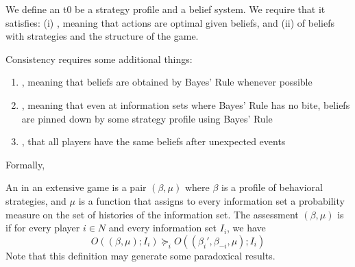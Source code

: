 \documentclass[10pt]{article}
\begin{document}
\begin{definition}
	We define an  t0 be a strategy profile and a belief system. We require that it satisfies: (i) , meaning that actions are optimal given beliefs, and (ii)  of beliefs with strategies and the structure of the game.
	
	Consistency requires some additional things:
	\begin{enumerate}
		\item {}, meaning that beliefs are obtained by Bayes' Rule whenever possible
		\item {}, meaning that even at information sets where Bayes' Rule has no bite, beliefs are pinned down by some strategy profile using Bayes' Rule
		\item {}, that all players have the same beliefs after unexpected events
	\end{enumerate}
\end{definition}

Formally,

\begin{definition}
	An  in an extensive game is a pair $(\beta,\mu)$ where $\beta$ is a profile of behavioral strategies, and $\mu$ is a function that assigns to every information set a probability measure on the set of histories of the information set. The assessment $(\beta,\mu)$ is  if for every player $i \in N$ and every information set $I_i$, we have
	\[
	O((\beta,\mu);I_i) \succeq_i O((\beta_i',\beta_{-i},\mu);I_i)
	\]
	Note that this definition may generate some paradoxical results.
\end{definition}
\end{document}
